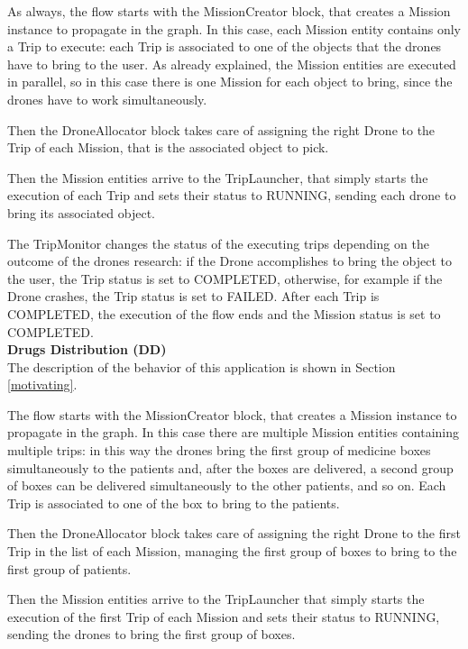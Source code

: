 As always, the flow starts with the MissionCreator block, that creates a Mission instance to propagate in the graph.
In this case, each Mission entity contains only a Trip to execute:
each Trip is associated to one of the objects that the drones have to bring to the user.
As already explained, the Mission entities are executed in parallel, so in this case
there is one Mission for each object to bring, since the drones have to work simultaneously.

Then the DroneAllocator block takes care of assigning the right Drone to the Trip of each Mission, that is the associated object to pick.

Then the Mission entities arrive to the TripLauncher, that simply starts the execution of each Trip and sets their status to RUNNING, sending each drone to bring its associated object.

The TripMonitor changes the status of the executing trips depending on the outcome of the drones research:
if the Drone accomplishes to bring the object to the user, the Trip status is set to COMPLETED, otherwise, for example if the Drone crashes, the Trip status is set to FAILED.
After each Trip is COMPLETED, the execution of the flow ends and the Mission status is set to COMPLETED.
\\


\textbf{Drugs Distribution (DD)}
\\

The description of the behavior of this application is shown in Section \ref{motivating}.

The flow starts with the MissionCreator block, that creates a Mission instance to propagate in the graph.
In this case there are multiple Mission entities containing multiple trips:
in this way the drones bring the first group of medicine boxes simultaneously to the patients and, after the boxes are delivered, a second group of boxes can be delivered simultaneously to the other patients, and so on.
Each Trip is associated to one of the box to bring to the patients.

Then the DroneAllocator block takes care of assigning the right Drone to the first Trip in the list of each Mission, managing the first group of boxes to bring to the first group of patients.

Then the Mission entities arrive to the TripLauncher that simply starts the execution of the first Trip of each Mission and sets their status to RUNNING, sending the drones to bring the first group of boxes.


